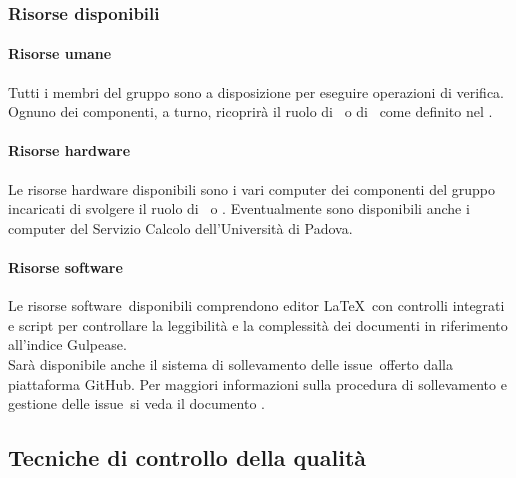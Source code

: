 \documentclass[../PianoDiQualifica.tex]{subfiles}
\begin{document}
		    \subsubsection{Risorse disponibili}
			    \paragraph{Risorse umane}
			    Tutti i membri del gruppo sono a disposizione per eseguire operazioni di verifica. Ognuno dei componenti, a turno, ricoprirà il ruolo di \responsabilediprogetto\ o di \verificatore\ come definito nel \pianodiprogettov.
			    \paragraph{Risorse hardware}
			    Le risorse hardware disponibili sono i vari computer dei componenti del gruppo incaricati di svolgere il ruolo di \responsabilediprogetto\ o \verificatore. Eventualmente sono disponibili anche i computer del Servizio Calcolo dell'Università di Padova.
				\paragraph{Risorse software}
				Le risorse software\g\ disponibili comprendono editor \LaTeX\g\ con controlli integrati e script per controllare la leggibilità e la complessità dei documenti in riferimento all'indice Gulpease\g.\\
				Sarà disponibile anche il sistema di sollevamento delle issue\g\ offerto dalla piattaforma GitHub\g. Per maggiori informazioni sulla procedura di sollevamento e gestione delle issue\g\ 
si veda il documento \normediprogettov.
		\subsection{Tecniche di controllo della qualità}
\end{document}
